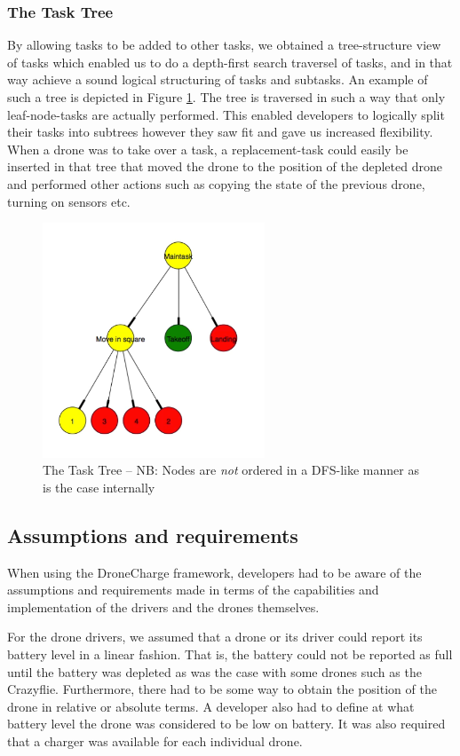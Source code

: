 \subsubsection{The Task Tree}
By allowing tasks to be added to other tasks, we obtained a tree-structure view of tasks which enabled us to do a depth-first search traversel of tasks, and in that way achieve a sound logical structuring of tasks and subtasks. An example of such a tree is depicted in Figure \ref{fig:tasktree}. The tree is traversed in such a way that only leaf-node-tasks are actually performed. This enabled developers to logically split their tasks into subtrees however they saw fit and gave us increased flexibility. When a drone was to take over a task, a replacement-task could easily be inserted in that tree that moved the drone to the position of the depleted drone and performed other actions such as copying the state of the previous drone, turning on sensors etc.

\begin{figure}[h]
\begin{center}
\includegraphics[height=7cm]{images/task-graph.png}
\caption{The Task Tree -- NB: Nodes are \textit{not} ordered in a DFS-like manner as is the case internally}
\label{fig:tasktree}
\end{center}
\end{figure}

\subsection{Assumptions and requirements}
When using the DroneCharge framework, developers had to be aware of the assumptions and requirements made in terms of the capabilities and implementation of the drivers and the drones themselves.

For the drone drivers, we assumed that a drone or its driver could report its battery level in a linear fashion. That is, the battery could not be reported as full until the battery was depleted as was the case with some drones such as the Crazyflie. Furthermore, there had to be some way to obtain the position of the drone in relative or absolute terms. A developer also had to define at what battery level the drone was considered to be low on battery. It was also required that a charger was available for each individual drone.

